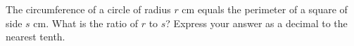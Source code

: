 The circumference of a circle of radius $r$ cm equals the perimeter of a square of side $s$ cm. What is the ratio of $r$ to $s$? Express your answer as a decimal to the nearest tenth.
